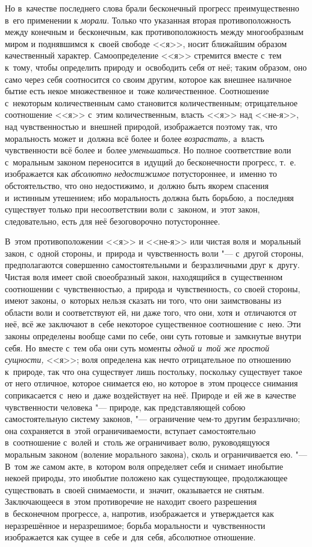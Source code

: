 Но в~качестве последнего слова брали бесконечный прогресс преимущественно в~его
применении к {\em морали}. Только что указанная вторая противоположность между
конечным и~бесконечным, как противоположность между многообразным миром и
поднявшимся к~своей свободе <<я>>, носит ближайшим образом качественный
характер. Самоопределение <<я>> стремится вместе с~тем к~тому, чтобы определить
природу и~освободить себя от неё; таким образом, оно само через себя
соотносится со своим другим, которое как внешнее наличное бытие есть некое
множественное и~тоже количественное. Соотношение с~некоторым количественным
само становится количественным; отрицательное соотношение <<я>> с~этим
количественным, власть <<я>> над <<не-я>>, над чувственностью и~внешней
природой, изображается поэтому так, что моральность может и~должна всё более и
более {\em возрастать,} а~власть чувственности всё более и~более
{\em уменьшаться}. Но полное соответствие воли с~моральным законом переносится
в~идущий до бесконечности прогресс, т.~е. изображается как
{\em абсолютно недостижимое} потустороннее, и~именно то обстоятельство, что оно
недостижимо, и~должно быть якорем спасения и~истинным утешением; ибо
моральность должна быть борьбою, а~последняя существует только при
несоответствии воли с~законом, и~этот закон, следовательно, есть для неё
безоговорочно потустороннее.

В~этом противоположении <<я>> и <<не-я>> или чистая воля и~моральный закон,
с~одной стороны, и~природа и~чувственность воли "--- с~другой стороны,
предполагаются совершенно самостоятельными и~безразличными друг к~другу. Чистая
воля имеет свой своеобразный закон, находящийся в~существенном соотношении
с~чувственностью, а~природа и~чувственность, со своей стороны, имеют законы,
о~которых нельзя сказать ни того, что они заимствованы из области воли и
соответствуют ей, ни даже того, что они, хотя и~отличаются от неё, всё же
заключают в~себе некоторое существенное соотношение с~нею. Эти законы
определены вообще сами по себе, они суть готовые и~замкнутые внутри себя. Но
вместе с~тем оба они суть моменты {\em одной и~той же простой сущности,} <<я>>;
воля определена как нечто отрицательное по отношению к~природе, так что она
существует лишь постольку, поскольку существует такое от него отличное, которое
снимается ею, но которое в~этом процессе снимания соприкасается с~нею и~даже
воздействует на неё. Природе и~ей же в~качестве чувственности человека "---
природе, как представляющей собою самостоятельную систему законов, "---
ограничение чем-то другим безразлично; она сохраняется в~этой ограничиваемости,
вступает самостоятельно в~соотношение с~волей и~столь же ограничивает волю,
руководящуюся моральным законом (воление морального закона), сколь и
ограничивается ею. "--- В~том же самом акте, в~котором воля определяет себя и
снимает инобытие некоей природы, это инобытие положено как существующее,
продолжающее существовать в~своей снимаемости, и~значит, оказывается не снятым.
Заключающееся в~этом противоречие не находит своего разрешения в~бесконечном
прогрессе, а, напротив, изображается и~утверждается как неразрешённое и
неразрешимое; борьба моральности и~чувственности изображается как сущее в~себе
и~для~себя, абсолютное отношение.

